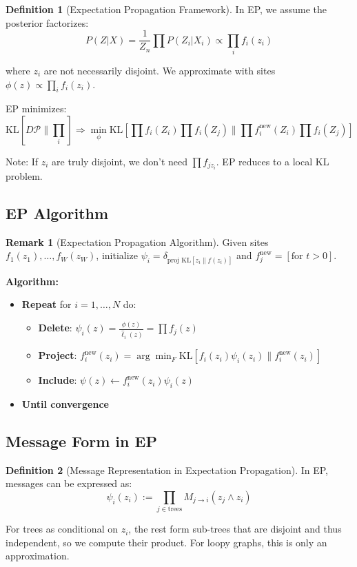 \documentclass[12pt,a4paper]{article}
\theoremstyle{definition}
\newtheorem{definition}{Definition}[section]
\newtheorem{remark}{Remark}[section]
\begin{document}
\begin{definition}[Expectation Propagation Framework]
In EP, we assume the posterior factorizes:
\[
P(Z|X) = \frac{1}{Z_n} \prod P(Z_i | X_i) \propto \prod_i f_i(z_i)
\]

where $z_i$ are not necessarily disjoint. We approximate with sites $\phi(z) \propto \prod_i f_i(z_i)$.

EP minimizes:
\[
\text{KL}[D\mathcal{P} \| \prod_i] \Rightarrow \min_{\phi} \text{KL}\left[\prod f_i(Z_i) \prod f_i(Z_j) \bigg\| \prod f_i^{\text{new}}(Z_i) \prod f_i(Z_j)\right]
\]

Note: If $z_i$ are truly disjoint, we don't need $\prod f_{jz_i}$. EP reduces to a local KL problem.
\end{definition}

\subsection{EP Algorithm}

\begin{remark}[Expectation Propagation Algorithm]
Given sites $f_1(z_1), \ldots, f_W(z_W)$, initialize $\psi_i = \delta_{\text{proj KL}[z_i \| f(z_i)]}$ and $f^{\text{new}}_j = [\text{for } t > 0]$.

\textbf{Algorithm:}
\begin{itemize}
    \item \textbf{Repeat} for $i = 1, \ldots, N$ do:
    \begin{itemize}
        \item \textbf{Delete}: $\psi_i(z) = \frac{\phi(z)}{\hat{\ell}_i(z)} = \prod f_j(z)$
        \item \textbf{Project}: $f_i^{\text{new}}(z_i) = \arg\min_F \text{KL}[f_i(z_i) \psi_i(z_i) \| f_i^{\text{new}}(z_i)]$
        \item \textbf{Include}: $\psi(z) \leftarrow f_i^{\text{new}}(z_i) \psi_i(z)$
    \end{itemize}
    \item \textbf{Until convergence}
\end{itemize}
\end{remark}

\subsection{Message Form in EP}

\begin{definition}[Message Representation in Expectation Propagation]
In EP, messages can be expressed as:
\[
\psi_i(z_i) := \prod_{j \in \text{trees}} M_{j \to i}(z_j \land z_i)
\]

For trees as conditional on $z_i$, the rest form sub-trees that are disjoint and thus independent, so we compute their product. For loopy graphs, this is only an approximation.
\end{definition}
\end{document}
